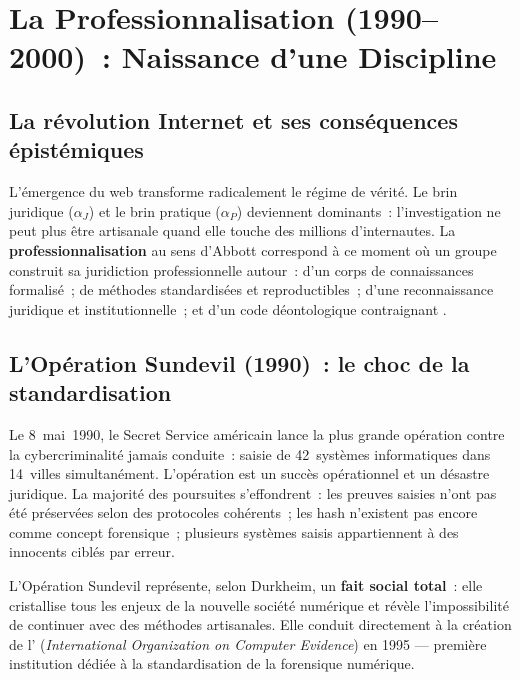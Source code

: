 \section{La Professionnalisation (1990--2000)~: Naissance d'une Discipline}

\subsection{La révolution Internet et ses conséquences épistémiques}

L'émergence du web transforme radicalement le régime de vérité. Le brin
juridique ($\alpha_J$) et le brin pratique ($\alpha_P$) deviennent dominants~:
l'investigation ne peut plus être artisanale quand elle touche des millions
d'internautes. La \textbf{professionnalisation} au sens d'Abbott correspond
à ce moment où un groupe construit sa juridiction professionnelle autour~:
d'un corps de connaissances formalisé~; de méthodes standardisées et
reproductibles~; d'une reconnaissance juridique et institutionnelle~; et
d'un code déontologique contraignant \cite{chap2pdf}.

\subsection{L'Opération Sundevil (1990)~: le choc de la standardisation}

Le 8~mai~1990, le Secret Service américain lance la plus grande opération
contre la cybercriminalité jamais conduite~: saisie de 42~systèmes
informatiques dans 14~villes simultanément. L'opération est un succès
opérationnel et un désastre juridique. La majorité des poursuites
s'effondrent~: les preuves saisies n'ont pas été préservées selon des
protocoles cohérents~; les hash n'existent pas encore comme concept
forensique~; plusieurs systèmes saisis appartiennent à des innocents ciblés
par erreur.

\medskip

L'Opération Sundevil représente, selon Durkheim, un \textbf{fait social total}~:
elle cristallise tous les enjeux de la nouvelle société numérique et révèle
l'impossibilité de continuer avec des méthodes artisanales. Elle conduit
directement à la création de l' (\textit{International Organization
on Computer Evidence}) en 1995 --- première institution dédiée à la
standardisation de la forensique numérique.

